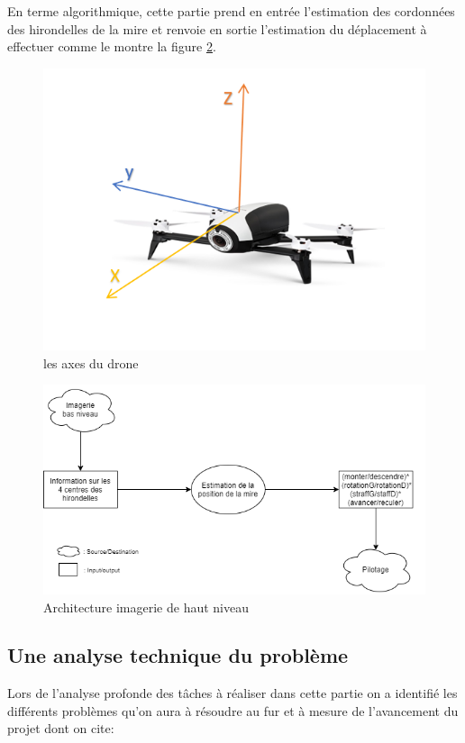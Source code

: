 \documentclass[12pt]{article}
\begin{document}
En terme algorithmique, cette partie prend en entrée l'estimation des cordonnées des hirondelles de la mire et renvoie en sortie l'estimation du déplacement à effectuer comme le montre la figure \ref{Architecture imagerie de haut niveau}.
\setlength{\unitlength}{1cm}
    \begin{figure}[h!]
    \centering
    \includegraphics[scale=0.7]{DRONE.PNG}
    \caption{\label{les axes du drone}les axes du drone}
    \end{figure}
\setlength{\unitlength}{1cm}
    \begin{figure}[h!]
    \centering
    \includegraphics[scale=0.7]{inout.png}
    \caption{\label{Architecture imagerie de haut niveau}Architecture imagerie de haut niveau}
    \end{figure}



\subsection{Une analyse technique du problème}
Lors de l'analyse profonde des tâches à réaliser dans cette partie on a identifié les différents problèmes qu'on aura à résoudre au fur et à mesure de l'avancement du projet dont on cite: 
\end{document}
